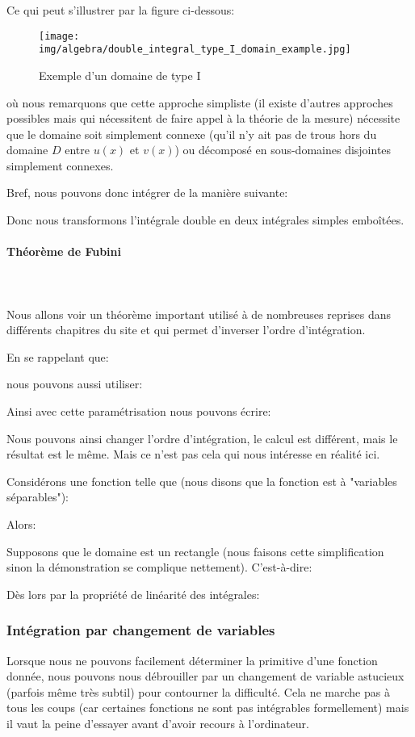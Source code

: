 	Ce qui peut s'illustrer par la figure ci-dessous:
	\begin{figure}[H]
		\centering
		\texttt{[image: img/algebra/double\_integral\_type\_I\_domain\_example.jpg]}
		\caption{Exemple d'un domaine de type I }
	\end{figure}
	où nous remarquons que cette approche simpliste (il existe d'autres approches possibles mais qui nécessitent de faire appel à la théorie de la mesure) nécessite que le domaine soit simplement connexe (qu'il n'y ait pas de trous hors du domaine $D$ entre $u (x)$ et $v (x)$) ou décomposé en sous-domaines disjointes simplement connexes.
	
	Bref, nous pouvons donc intégrer de la manière suivante:
	
	Donc nous transformons l'intégrale double en deux intégrales simples emboîtées.
	
	\paragraph{Théorème de Fubini}\label{fubini theorem}\mbox{}\\\\
	Nous allons voir un théorème important utilisé à de nombreuses reprises dans différents chapitres du site et qui permet d'inverser l'ordre d'intégration.

	En se rappelant que:
	
	nous pouvons aussi utiliser:
	
	Ainsi avec cette paramétrisation nous pouvons écrire:
	
	Nous pouvons ainsi changer l'ordre d'intégration, le calcul est différent, mais le résultat est le même. Mais ce n'est pas cela qui nous intéresse en réalité ici.
	
	Considérons une fonction telle que (nous disons que la fonction est à "variables séparables"):
	
	Alors:
	
	Supposons que le domaine est un rectangle (nous faisons cette simplification sinon la démonstration se complique nettement). C'est-à-dire:
	
	Dès lors par la propriété de linéarité des intégrales:
	
	
	\subsubsection{Intégration par changement de variables}
	Lorsque nous ne pouvons facilement déterminer la primitive d'une fonction donnée, nous pouvons nous débrouiller par un changement de variable astucieux (parfois même très subtil) pour contourner la difficulté. Cela ne marche pas à tous les coups (car certaines fonctions ne sont pas intégrables formellement) mais il vaut la peine d'essayer avant d'avoir recours à l'ordinateur.

